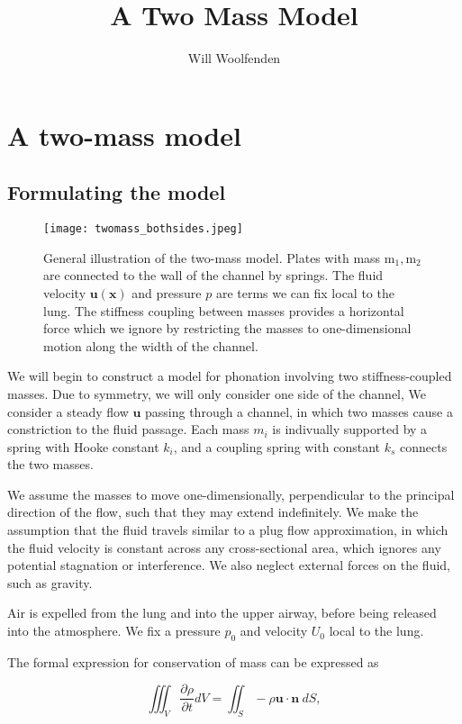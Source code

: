 \documentclass{article}
\begin{document}
\title{A Two Mass Model}
\author{Will Woolfenden}

\section{A two-mass model}

\subsection{Formulating the model}

\begin{figure}
    \centering
    \texttt{[image: twomass\_bothsides.jpeg]}
    \caption{General illustration of the two-mass model. Plates with mass $\mathrm{m_1},\mathrm{m_2}$ are connected to the wall of the channel by springs.
    The fluid velocity $\bm{u(x)}$ and pressure $p$ are terms we can fix local to the lung.
    The stiffness coupling between masses provides a horizontal force which we ignore by restricting the masses to one-dimensional motion along the width of the channel.}
    \label{fig:twomass_bothsides}
\end{figure}

We will begin to construct a model for phonation involving two stiffness-coupled masses.
Due to symmetry, we will only consider one side of the channel, 
We consider a steady flow $\mathbf{u}$ passing through a channel,
in which two masses cause a constriction to the fluid passage.
Each mass $m_i$ is indivually supported by a spring with Hooke constant $k_i$,
and a coupling spring with constant $k_s$ connects the two masses.

We assume the masses to move one-dimensionally, perpendicular to the principal direction of the flow,
such that they may extend indefinitely.
We make the assumption that the fluid travels similar to a plug flow approximation,
in which the fluid velocity is constant across any cross-sectional area, %
which ignores any potential stagnation or interference.
We also neglect external forces on the fluid, such as gravity.

Air is expelled from the lung and into the upper airway, before being released into the atmosphere.
We fix a pressure $p_0$ and velocity $U_0$ local to the lung.

The formal expression for conservation of mass can be expressed as

\begin{equation}
    \iiint_V \frac{\partial\rho}{\partial t}dV = \iint_S -\rho \bm{u\cdot n}~dS,
    \label{eqn:cons_mass_formal}
\end{equation}
\end{document}
